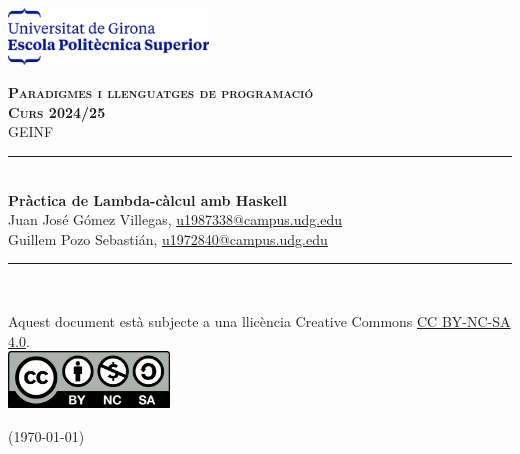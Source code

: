 \documentclass[10pt,a4paper]{article}
\begin{document}
    \begin{titlepage}
        \newcommand{\HRule}{\rule{\linewidth}{0.5mm}} %
        \begin{flushleft}
            \includegraphics[height=1.5cm]{EPS.png}\\\vfill
        \end{flushleft}
        \center %
        \textsc{\huge \bfseries Paradigmes i llenguatges de programació }\\[0.25cm]
        \textsc{\Large \bfseries Curs 2024/25}\\[0.25cm]
        \textsc{\large GEINF }
        \HRule \\[0.4cm]
        { \huge \bfseries Pràctica de Lambda-càlcul amb Haskell} \\[0.4cm] %
{Juan José Gómez Villegas, \href{mailto:u1987338@campus.udg.edu}{u1987338@campus.udg.edu}} \\ {Guillem Pozo Sebastián, \href{mailto:u1972840@campus.udg.edu}{u1972840@campus.udg.edu}}
        \HRule \\\vfill
        \begin{minipage}{0.4\textwidth}
            \begin{flushleft}
		\footnotesize{Aquest document està subjecte a una llicència Creative Commons \href{https://creativecommons.org/licenses/by-nc-sa/4.0/?ref=chooser-v1}{CC BY-NC-SA 4.0}.} \\\vfill
		\includegraphics[height=1.5cm]{CC_license.png}
            \end{flushleft}
        \end{minipage}
        \hfill
        \begin{minipage}{0.4\textwidth}
            \begin{flushright} \large
                {\small (\today)}
            \end{flushright}
        \end{minipage}
    \end{titlepage}
\end{document}
